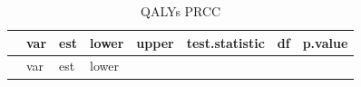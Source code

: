 \documentclass[
]{article}
\begin{document}
\begin{longtable}[]{@{}
  >{\raggedright\arraybackslash}p{}
  >{\raggedright\arraybackslash}p{}
  >{\raggedleft\arraybackslash}p{}
  >{\raggedleft\arraybackslash}p{}
  >{\raggedleft\arraybackslash}p{}
  >{\raggedleft\arraybackslash}p{}
  >{\raggedleft\arraybackslash}p{}
  >{\raggedleft\arraybackslash}p{}@{}}
\caption{QALYs PRCC}\tabularnewline
\toprule\noalign{}
\begin{minipage}[b]{\linewidth}\raggedright
\end{minipage} & \begin{minipage}[b]{\linewidth}\raggedright
var
\end{minipage} & \begin{minipage}[b]{\linewidth}\raggedleft
est
\end{minipage} & \begin{minipage}[b]{\linewidth}\raggedleft
lower
\end{minipage} & \begin{minipage}[b]{\linewidth}\raggedleft
upper
\end{minipage} & \begin{minipage}[b]{\linewidth}\raggedleft
test.statistic
\end{minipage} & \begin{minipage}[b]{\linewidth}\raggedleft
df
\end{minipage} & \begin{minipage}[b]{\linewidth}\raggedleft
p.value
\end{minipage} \\
\midrule\noalign{}
\endfirsthead
\toprule\noalign{}
\begin{minipage}[b]{\linewidth}\raggedright
\end{minipage} & \begin{minipage}[b]{\linewidth}\raggedright
var
\end{minipage} & \begin{minipage}[b]{\linewidth}\raggedleft
est
\end{minipage} & \begin{minipage}[b]{\linewidth}\raggedleft
lower
\end{minipage} & \begin{minipage}[b]{\linewidth}\raggedleft

\end{minipage}
\end{longtable}
\end{document}

